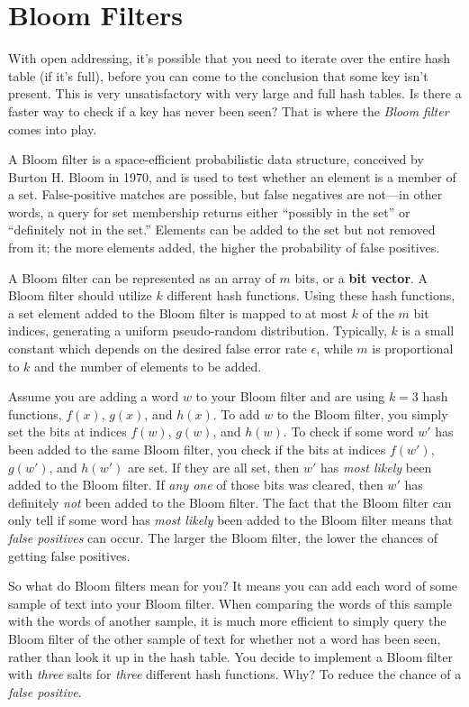 \section{Bloom Filters}\label{sec:bloom}

\noindent With open addressing, it's possible that you need to iterate over the
entire hash table (if it's full), before you can come to the conclusion that
some key isn't present. This is very unsatisfactory with very large and full
hash tables. Is there a faster way to check if a key has never been seen? That
is where the \emph{Bloom filter} comes into play.

A Bloom filter is a space-efficient probabilistic data structure, conceived by
Burton H. Bloom in 1970, and is used to test whether an element is a member of a
set. False-positive matches are possible, but false negatives are not---in other
words, a query for set membership returns either ``possibly in the set'' or
``definitely not in the set.'' Elements can be added to the set but not removed
from it; the more elements added, the higher the probability of false positives.

A Bloom filter can be represented as an array of $m$ bits, or a \textbf{bit
vector}. A Bloom filter should utilize $k$ different hash functions. Using these
hash functions, a set element added to the Bloom filter is mapped to at most $k$
of the $m$ bit indices, generating a uniform pseudo-random distribution.
Typically, $k$ is a small constant which depends on the desired false error rate
$\epsilon$, while $m$ is proportional to $k$ and the number of elements to be
added.

Assume you are adding a word $w$ to your Bloom filter and are using $k=3$ hash
functions, $f(x)$, $g(x)$, and $h(x)$. To add $w$ to the Bloom filter, you
simply set the bits at indices $f(w)$, $g(w)$, and $h(w)$. To check if some word
$w'$ has been added to the same Bloom filter, you check if the bits at indices
$f(w')$, $g(w')$, and $h(w')$ are set. If they are all set, then $w'$ has
\emph{most likely} been added to the Bloom filter. If \emph{any one} of those
bits was cleared, then $w'$ has definitely \emph{not} been added to the Bloom
filter. The fact that the Bloom filter can only tell if some word has \emph{most
likely} been added to the Bloom filter means that \emph{false positives} can
occur. The larger the Bloom filter, the lower the chances of getting false
positives.

So what do Bloom filters mean for you? It means you can add each word of some
sample of text into your Bloom filter. When comparing the words of this sample
with the words of another sample, it is much more efficient to simply query the
Bloom filter of the other sample of text for whether not a word has been seen,
rather than look it up in the hash table. You decide to implement a Bloom filter
with \emph{three} salts for \emph{three} different hash functions. Why? To
reduce the chance of a \emph{false positive}.

